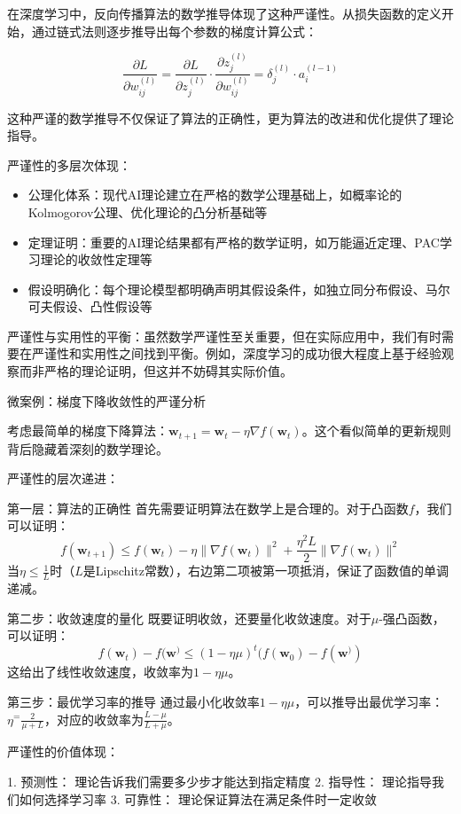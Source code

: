 在深度学习中，反向传播算法的数学推导体现了这种严谨性。从损失函数的定义开始，通过链式法则逐步推导出每个参数的梯度计算公式：

$$\frac{\partial L}{\partial w_{ij}^{(l)}} = \frac{\partial L}{\partial z_j^{(l)}} \cdot \frac{\partial z_j^{(l)}}{\partial w_{ij}^{(l)}} = \delta_j^{(l)} \cdot a_i^{(l-1)}$$

这种严谨的数学推导不仅保证了算法的正确性，更为算法的改进和优化提供了理论指导。

严谨性的多层次体现：

\begin{itemize}
\item 公理化体系：现代AI理论建立在严格的数学公理基础上，如概率论的Kolmogorov公理、优化理论的凸分析基础等
\item 定理证明：重要的AI理论结果都有严格的数学证明，如万能逼近定理、PAC学习理论的收敛性定理等
\item 假设明确化：每个理论模型都明确声明其假设条件，如独立同分布假设、马尔可夫假设、凸性假设等
\end{itemize}

严谨性与实用性的平衡：虽然数学严谨性至关重要，但在实际应用中，我们有时需要在严谨性和实用性之间找到平衡。例如，深度学习的成功很大程度上基于经验观察而非严格的理论证明，但这并不妨碍其实际价值。

微案例：梯度下降收敛性的严谨分析

考虑最简单的梯度下降算法：$\mathbf{w}_{t+1} = \mathbf{w}_t - \eta \nabla f(\mathbf{w}_t)$。这个看似简单的更新规则背后隐藏着深刻的数学理论。

严谨性的层次递进：

第一层：算法的正确性
首先需要证明算法在数学上是合理的。对于凸函数$f$，我们可以证明：
$$f(\mathbf{w}_{t+1}) \leq f(\mathbf{w}_t) - \eta \|\nabla f(\mathbf{w}_t)\|^2 + \frac{\eta^2 L}{2} \|\nabla f(\mathbf{w}_t)\|^2$$
当$\eta \leq \frac{1}{L}$时（$L$是Lipschitz常数），右边第二项被第一项抵消，保证了函数值的单调递减。

第二步：收敛速度的量化
既要证明收敛，还要量化收敛速度。对于$\mu$-强凸函数，可以证明：
$$f(\mathbf{w}_t) - f(\mathbf{w}^) \leq \left(1 - \eta\mu\right)^t (f(\mathbf{w}_0) - f(\mathbf{w}^))$$
这给出了线性收敛速度，收敛率为$1-\eta\mu$。

第三步：最优学习率的推导
通过最小化收敛率$1-\eta\mu$，可以推导出最优学习率：$\eta^ = \frac{2}{\mu + L}$，对应的收敛率为$\frac{L-\mu}{L+\mu}$。

严谨性的价值体现：

1. 预测性： 理论告诉我们需要多少步才能达到指定精度
2. 指导性： 理论指导我们如何选择学习率
3. 可靠性： 理论保证算法在满足条件时一定收敛

